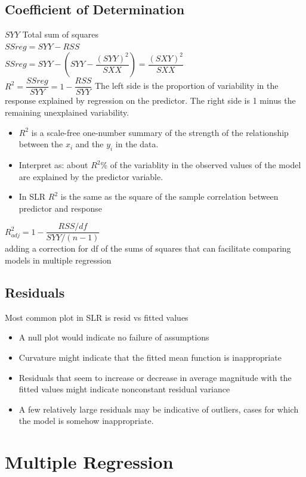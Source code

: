 \documentclass[openany]{book}
\numberwithin{equation}{section}
\begin{document}
\begin{flushleft}
\section{Coefficient of Determination}
$SYY$ Total sum of squares\\
$SSreg=SYY-RSS$\\
$SSreg=SYY-\left(SYY-\dfrac{(SYY)^2}{SXX}\right)=\dfrac{(SXY)^2}{SXX}$\\
$R^2=\dfrac{SSreg}{SYY}=1-\dfrac{RSS}{SYY}$\medbreak
The left side is the proportion of variability in the response explained by regression on the predictor. The right side is 1 minus the remaining unexplained variability.
\begin{itemize}
\item $R^2$ is a scale-free one-number summary of the strength of the relationship
between the $x_i$ and the $y_i$ in the data.\\
\item Interpret as: about $R^2$\% of the variablity in the observed values of the model are explained by the predictor variable.\\
\item In SLR $R^2$ is the same as the square of the sample correlation between predictor and response\\
\end{itemize}
$R_{adj}^2=1-\dfrac{RSS/df}{SYY/(n-1)}$\\
adding a correction for df of the sums of squares that can facilitate comparing models in multiple regression
\section{Residuals}
Most common plot in SLR is resid vs fitted values
\begin{itemize}
\item A null plot would indicate no failure
of assumptions\\
\item Curvature might indicate that the fitted mean function is inappropriate\\
\item Residuals that seem to increase or decrease in average magnitude with the fitted values might indicate nonconstant residual variance\\
\item A few relatively large residuals may be indicative of outliers, cases for which the model is somehow inappropriate.
\end{itemize}
\chapter{Multiple Regression}

\end{flushleft}
\end{document}
